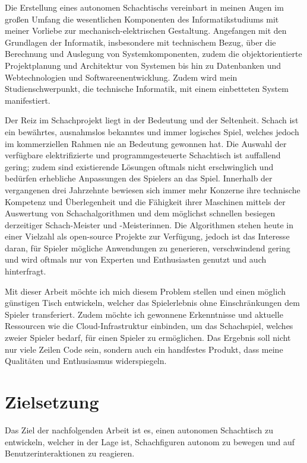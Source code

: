 Die Erstellung eines autonomen Schachtischs vereinbart in meinen Augen
im großen Umfang die wesentlichen Komponenten des Informatikstudiums mit
meiner Vorliebe zur mechanisch-elektrischen Gestaltung. Angefangen mit
den Grundlagen der Informatik, insbesondere mit technischem Bezug, über
die Berechnung und Auslegung von Systemkomponenten, zudem die
objektorientierte Projektplanung und Architektur von Systemen bis hin zu
Datenbanken und Webtechnologien und Softwareenentwicklung. Zudem wird
mein Studienschwerpunkt, die technische Informatik, mit einem
einbetteten System manifestiert.

Der Reiz im Schachprojekt liegt in der Bedeutung und der Seltenheit.
Schach ist ein bewährtes, ausnahmslos bekanntes und immer logisches
Spiel, welches jedoch im kommerziellen Rahmen nie an Bedeutung gewonnen
hat. Die Auswahl der verfügbare elektrifizierte und programmgesteuerte
Schachtisch ist auffallend gering; zudem sind existierende Lösungen
oftmals nicht erschwinglich und bedürfen erhebliche Anpassungen des
Spielers an das Spiel. Innerhalb der vergangenen drei Jahrzehnte
bewiesen sich immer mehr Konzerne ihre technische Kompetenz und
Überlegenheit und die Fähigkeit ihrer Maschinen mittels der Auswertung
von Schachalgorithmen und dem möglichst schnellen besiegen derzeitiger
Schach-Meister und -Meisterinnen. Die Algorithmen stehen heute in einer
Vielzahl als open-source Projekte zur Verfügung, jedoch ist das
Interesse daran, für Spieler mögliche Anwendungen zu generieren,
verschwindend gering und wird oftmals nur von Experten und Enthusiasten
genutzt und auch hinterfragt.

Mit dieser Arbeit möchte ich mich diesem Problem stellen und einen
möglich günstigen Tisch entwickeln, welcher das Spielerlebnis ohne
Einschränkungen dem Spieler transferiert. Zudem möchte ich gewonnene
Erkenntnisse und aktuelle Ressourcen wie die Cloud-Infrastruktur
einbinden, um das Schachspiel, welches zweier Spieler bedarf, für einen
Spieler zu ermöglichen. Das Ergebnis soll nicht nur viele Zeilen Code
sein, sondern auch ein handfestes Produkt, dass meine Qualitäten und
Enthusiasmus widerspiegeln.

\hypertarget{zielsetzung}{%
\section{Zielsetzung}\label{zielsetzung}}

Das Ziel der nachfolgenden Arbeit ist es, einen autonomen Schachtisch zu
entwickeln, welcher in der Lage ist, Schachfiguren autonom zu bewegen
und auf Benutzerinteraktionen zu reagieren.


